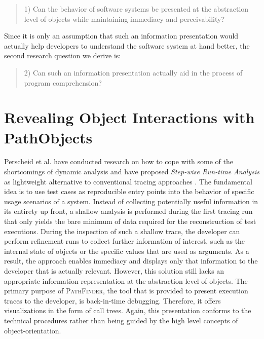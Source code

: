 \begin{quote}
1) Can the behavior of software systems be presented at the abstraction level of objects while maintaining immediacy and perceivability?
\end{quote}

Since it is only an assumption that such an information presentation would actually help developers to understand the software system at hand better, the second research question we derive is:

\begin{quote}
2) Can such an information presentation actually aid in the process of program comprehension?
\end{quote}

\section{Revealing Object Interactions with PathObjects}

Perscheid et al. have conducted research on how to cope with some of the shortcomings of dynamic analysis and have proposed \emph{Step-wise Run-time Analysis} as lightweight alternative to conventional tracing approaches \cite{perscheid_immediacy_2010}.
The fundamental idea is to use test cases as reproducible entry points into the behavior of specific usage scenarios of a system.
Instead of collecting potentially useful information in its entirety up front, a shallow analysis is performed during the first tracing run that only yields the bare minimum of data required for the reconstruction of test executions.
During the inspection of such a shallow trace, the developer can perform refinement runs to collect further information of interest, such as the internal state of objects or the specific values that are used as arguments.
As a result, the approach enables immediacy and displays only that information to the developer that is actually relevant.
However, this solution still lacks an appropriate information representation at the abstraction level of objects.
The primary purpose of \textsc{PathFinder}, the tool that is provided to present execution traces to the developer, is back-in-time debugging.
Therefore, it offers visualizations in the form of call trees.
Again, this presentation conforms to the technical procedures rather than being guided by the high level concepts of object-orientation.

